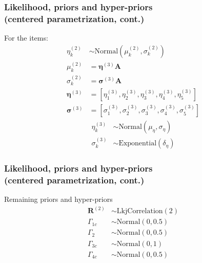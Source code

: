 \documentclass[nonav,sleutel]{beamer}
\begin{document}
	\begin{frame}
		\frametitle{Likelihood, priors and hyper-priors \\
			(centered parametrization, cont.)}
		For the items:
		\begin{align}
			\eta^{(2)}_{k} &\sim \text{Normal} \left( \mu^{(2)}_{k}, \sigma^{(2)}_{k} \right) \label{eq:items} \\
			\mu^{(2)}_{k} &= \pmb{\eta}^{(3)} \mathbf{A} \label{eq:mu_items} \\
			\sigma^{(2)}_{k} &= \pmb{\sigma}^{(3)} \mathbf{A} \label{eq:sigma_items} \\
			\pmb{\eta}^{(3)} &= [ \eta^{(3)}_{1}, \eta^{(3)}_{2}, \eta^{(3)}_{3}, \eta^{(3)}_{4}, \eta^{(3)}_{5} ] \\
			\pmb{\sigma}^{(3)} &= [ \sigma^{(3)}_{1}, \sigma^{(3)}_{2}, \sigma^{(3)}_{3}, \sigma^{(3)}_{4}, \sigma^{(3)}_{5} ]
		\end{align}
		\begin{align}
			\eta^{(3)}_{k} &\sim \text{Normal} \left( \mu_{\eta}, \sigma_{\eta} \right) \\
			\sigma^{(3)}_{k} &\sim \text{Exponential} \left( \delta_{\eta} \right)
		\end{align}
	\end{frame}
	\begin{frame}
		\frametitle{Likelihood, priors and hyper-priors \\
			(centered parametrization, cont.)}
		Remaining priors and hyper-priors
		\begin{align}
			\boldsymbol{R}^{(2)} &\sim \text{LkjCorrelation}( 2 ) \\
			\Gamma_{1c} &\sim \text{Normal}( 0, 0.5 ) \\
			\Gamma_{2} &\sim \text{Normal}( 0, 0.5 ) \\
			\Gamma_{3c} &\sim \text{Normal}( 0, 1 ) \\
			\Gamma_{4c} &\sim \text{Normal}( 0, 0.5 ) 
		\end{align}
	\end{frame}
\end{document}

